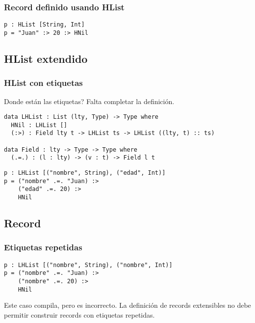 \documentclass{beamer}
\begin{document}
\begin{frame}[fragile]
\frametitle{Record definido usando HList}

\begin{example}
\begin{verbatim}
p : HList [String, Int]
p = "Juan" :> 20 :> HNil
\end{verbatim}
\end{example}

\end{frame}

\subsection{HList extendido}

\begin{frame}[fragile]
\frametitle{HList con etiquetas}

Donde están las etiquetas? Falta completar la definición.

\pause

\begin{example}
\begin{verbatim}
data LHList : List (lty, Type) -> Type where
  HNil : LHList []
  (:>) : Field lty t -> LHList ts -> LHList ((lty, t) :: ts)

data Field : lty -> Type -> Type where
  (.=.) : (l : lty) -> (v : t) -> Field l t
\end{verbatim}
\end{example}

\pause

\begin{example}
\begin{verbatim}
p : LHList [("nombre", String), ("edad", Int)]
p = ("nombre" .=. "Juan) :> 
    ("edad" .=. 20) :> 
    HNil
\end{verbatim}
\end{example}

\end{frame}

\subsection{Record}

\begin{frame}[fragile]
\frametitle{Etiquetas repetidas}

\begin{example}
\begin{verbatim}
p : LHList [("nombre", String), ("nombre", Int)]
p = ("nombre" .=. "Juan) :> 
    ("nombre" .=. 20) :> 
    HNil
\end{verbatim}
\end{example}

\pause

Este caso compila, pero es incorrecto. La definición de records extensibles no debe permitir construir records con etiquetas repetidas.

\end{frame}
\end{document}
